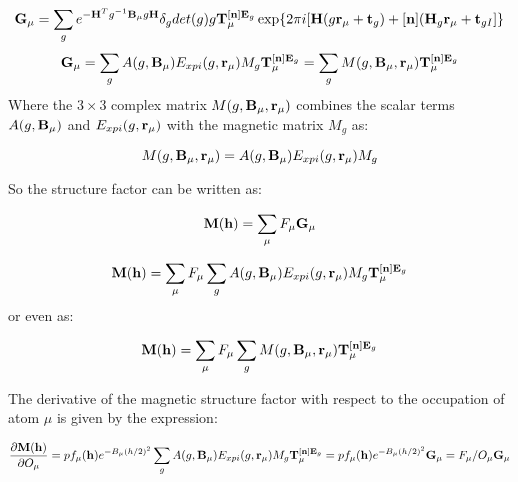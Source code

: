 \documentclass[10pt]{article}
\begin{document}
\begin{equation} \label{sumg}
{\bf G}_\mu= \sum_g e^{-{\bf H}^{T} g^{-1}{\bf B}_\mu g {\bf H}}\delta_g det(g) g {\bf T}_{\mu}^{[{\bf n}]{\bf E}_g}   \exp\{2\pi i [ {\bf H}(g{\bf r}_\mu+{\bf t}_g) + [{\bf n}] ({\bf H}_g{\bf r}_\mu+ {\bf t}_{gI}] \}  
\end{equation}
\begin{equation} \label{sumg2}
{\bf G}_\mu= \sum_g A(g,{\bf B}_\mu) E_{xpi}(g,{\bf r}_\mu) M_g {\bf T}_{\mu}^{[{\bf n}]{\bf E}_g} =  \sum_g M(g,{\bf B}_\mu,{\bf r}_\mu)  {\bf T}_{\mu}^{[{\bf n}]{\bf E}_g}   
\end{equation}
Where the $3\times 3$ complex matrix $ M(g,{\bf B}_\mu,{\bf r}_\mu)$ combines the scalar terms $A(g,{\bf B}_\mu)$ and $E_{xpi}(g,{\bf r}_\mu)$ with the magnetic matrix $M_g$ as:

\begin{equation} \label{mat_compl}
 M(g,{\bf B}_\mu,{\bf r}_\mu) = A(g,{\bf B}_\mu) E_{xpi}(g,{\bf r}_\mu) M_g 
\end{equation}


So the structure factor can be written as:

\begin{equation} \label{magstrf_2}
{\bf M}({\bf h})= \sum_{{\mu}}  F_\mu {\bf G}_\mu   
\end{equation}

\begin{equation} \label{magstrf_3}
{\bf M}({\bf h})=\sum_{{\mu}}   F_\mu \sum_g A(g,{\bf B}_\mu) E_{xpi}(g,{\bf r}_\mu) M_g {\bf T}_{\mu}^{[{\bf n}]{\bf E}_g}    
\end{equation}
or even as:

\begin{equation} \label{magstrf_4}
{\bf M}({\bf h})= \sum_{{\mu}}   F_\mu \sum_g M(g,{\bf B}_\mu,{\bf r}_\mu) {\bf T}_{\mu}^{[{\bf n}]{\bf E}_g}    
\end{equation}

The derivative of the magnetic structure factor with respect to the occupation of atom $\mu$ is given by the expression:

\begin{equation} \label{der_occ}
\frac{\partial{\bf M}({\bf h})}{\partial O_\mu}=p f_{\mu}({\bf h}) e^{-B_\mu (h/2)^2 } \sum_g A(g,{\bf B}_\mu) E_{xpi}(g,{\bf r}_\mu) M_g {\bf T}_{\mu}^{[{\bf n}]{\bf E}_g} =  p f_{\mu}({\bf h}) e^{-B_\mu (h/2)^2 } {\bf G}_\mu= F_\mu/O_\mu  {\bf G}_\mu
\end{equation}
\end{document}
